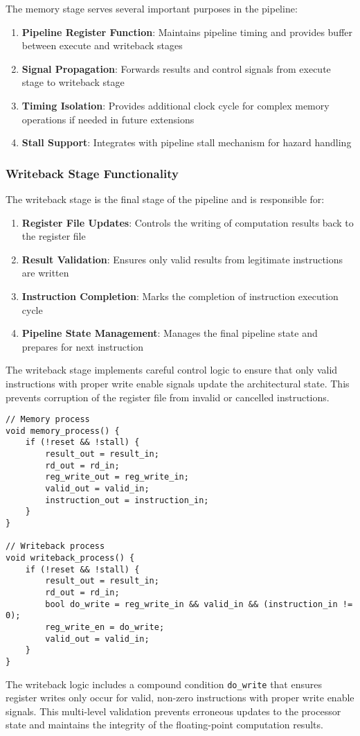 The memory stage serves several important purposes in the pipeline:
\begin{enumerate}
    \item \textbf{Pipeline Register Function}: Maintains pipeline timing and provides buffer between execute and writeback stages
    \item \textbf{Signal Propagation}: Forwards results and control signals from execute stage to writeback stage
    \item \textbf{Timing Isolation}: Provides additional clock cycle for complex memory operations if needed in future extensions
    \item \textbf{Stall Support}: Integrates with pipeline stall mechanism for hazard handling
\end{enumerate}

\subsubsection{Writeback Stage Functionality}

The writeback stage is the final stage of the pipeline and is responsible for:
\begin{enumerate}
    \item \textbf{Register File Updates}: Controls the writing of computation results back to the register file
    \item \textbf{Result Validation}: Ensures only valid results from legitimate instructions are written
    \item \textbf{Instruction Completion}: Marks the completion of instruction execution cycle
    \item \textbf{Pipeline State Management}: Manages the final pipeline state and prepares for next instruction
\end{enumerate}

The writeback stage implements careful control logic to ensure that only valid instructions with proper write enable signals update the architectural state. This prevents corruption of the register file from invalid or cancelled instructions.

\begin{lstlisting}[caption={Memory and Writeback Processes}]
// Memory process
void memory_process() {
    if (!reset && !stall) {
        result_out = result_in;
        rd_out = rd_in;
        reg_write_out = reg_write_in;
        valid_out = valid_in;
        instruction_out = instruction_in;
    }
}

// Writeback process
void writeback_process() {
    if (!reset && !stall) {
        result_out = result_in;
        rd_out = rd_in;
        bool do_write = reg_write_in && valid_in && (instruction_in != 0);
        reg_write_en = do_write;
        valid_out = valid_in;
    }
}
\end{lstlisting}

The writeback logic includes a compound condition \texttt{do\_write} that ensures register writes only occur for valid, non-zero instructions with proper write enable signals. This multi-level validation prevents erroneous updates to the processor state and maintains the integrity of the floating-point computation results.

